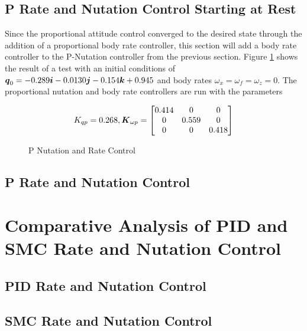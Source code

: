 \subsection{P Rate and Nutation Control Starting at Rest}
\label{subsec:PRateNutationControlStartingatRest}

Since the proportional attitude control converged to the desired state through the addition of a proportional body rate controller, this section will add a body rate controller to the P-Nutation controller from the previous section.  Figure \ref{fig:PNutationRateControl} shows the result of a test with an initial conditions of $\boldsymbol{q}_0 = -0.289\boldsymbol{i} -0.0130 \boldsymbol{j} -0.154 \boldsymbol{k} + 0.945$ and body rates $\omega_x = \omega_f = \omega_z = 0$.  The proportional nutation and body rate controllers are run with the parameters

\begin{equation}
  K_{qp} = 0.268, \boldsymbol{K}_{\omega p} = \begin{bmatrix} 0.414 & 0 & 0 \\ 0 & 0.559 & 0 \\ 0 & 0 & 0.418 \end{bmatrix}
\end{equation}

\begin{figure}[H]
  \centerline{}
  \caption{P Nutation and Rate Control}
  \label{fig:PNutationRateControl}
\end{figure}

\subsection{P Rate and Nutation Control}
\label{subsec:PRateNutationControl}


\section{Comparative Analysis of PID and SMC Rate and Nutation Control}
\label{sec:ComparativeAnalysisofPIDandSMCRateandNutationControl}


\subsection{PID Rate and Nutation Control}
\label{subsec:PIDRateandNutationControl}


\subsection{SMC Rate and Nutation Control}
\label{subsec:SMC}


